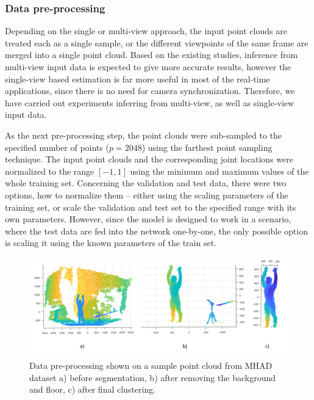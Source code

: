\subsubsection{Data pre-processing}
Depending on the single or multi-view approach, the input point clouds are treated each as a single sample, or the different viewpoints of the same frame are merged into a single point cloud. Based on the existing studies, inference from multi-view input data is expected to give more accurate results, however the single-view based estimation is far more useful in most of the real-time applications, since there is no need for camera synchronization. Therefore, we have carried out experiments inferring from multi-view, as well as single-view input data.\par
\par
\vspace{5mm}
\noindent
As the next pre-processing step, the point clouds were sub-sampled to the specified number of points ($p = 2048$) using the farthest point sampling technique. The input point clouds and the corresponding joint locations were normalized to the range $ [-1, 1]$ using the minimum and maximum values of the whole training set. Concerning the validation and test data, there were two options, how to normalize them – either using the scaling parameters of the training set, or scale the validation and test set to the specified range with its own parameters. However, since the model is designed to work in a scenario, where the test data are fed into the network one-by-one, the only possible option is scaling it using the known parameters of the train set.\par

\vspace{5mm}

\begin{figure}[H]
\begin{center}
  \includegraphics[width=\textwidth]{images/implementation/mhad.png}
  \caption[Data pre-processing shown on a sample point cloud from MHAD dataset.]{ Data pre-processing shown on a sample point cloud from MHAD dataset a) before segmentation, b) after removing the background and floor, c) after final clustering.}
  \label{fig:mhad}
\end{center}
\end{figure}


